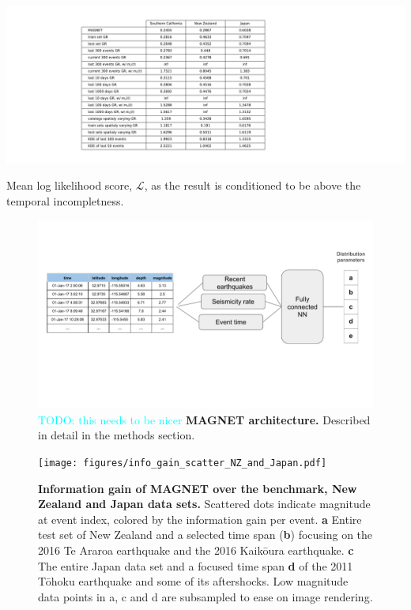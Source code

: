 \documentclass[pdflatex]{sn-jnl}
\newcommand{\neri}[1]{{\textcolor{cyan}{#1}}}
\begin{document}
\newpage
\begin{table}[h!]
    \centering
    \includegraphics[width=1\textwidth]{figures/mean_ll_cond_table.pdf}
    \caption{Mean log likelihood score, $\mathcal{L}$, as the result is conditioned to be above the temporal incompletness.}
    \label{tab:mean_ll_all_benchmarks_conditioned}
\end{table}


\newpage
\begin{figure}[h!]
    \centering
    \includegraphics[width=1\textwidth]{figures/detailed_architecture.pdf}
    \caption{\neri{TODO: this needs to be nicer} \textbf{MAGNET architecture.} Described in detail in the methods section.}
    \label{fig:architecture}
\end{figure}

\newpage
\begin{figure}[h!]
	\centering
        \texttt{[image: figures/info\_gain\_scatter\_NZ\_and\_Japan.pdf]}
	\caption{
            \textbf{Information gain of MAGNET over the benchmark, New Zealand and Japan data sets.} Scattered dots indicate magnitude at event index, colored by the information gain per event. \textbf{a} Entire test set of New Zealand and a selected time span (\textbf{b}) focusing on the 2016 Te Araroa earthquake and the 2016 Kaikōura earthquake. \textbf{c} The entire Japan data set and a focused time span \textbf{d} of the 2011 Tōhoku earthquake and some of its aftershocks. Low magnitude data points in a, c and d are subsampled to ease on image rendering.
         }
\label{fig:nz_japan_info_gain}
\end{figure}
\end{document}
